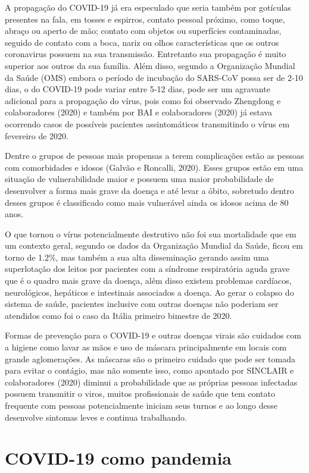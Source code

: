 A propagação do COVID-19 já era especulado que seria também por gotículas presentes na fala, em tosses e espirros, contato pessoal próximo, como toque, abraço ou aperto de mão; contato com objetos ou superfícies contaminadas, seguido de contato com a boca, nariz ou olhos características que os outros coronavirus possuem na sua transmissão. Entretanto sua propagação é muito superior aos outros da sua família. Além disso, segundo a Organização Mundial da Saúde (OMS) embora o período de incubação do SARS-CoV possa ser de 2-10 dias, o do COVID-19 pode variar entre 5-12 dias, pode ser um agravante adicional para a propagação do vírus, pois como foi observado Zhengdong e colaboradores (2020) e também por BAI e colaboradores (2020) já estava ocorrendo casos de possíveis pacientes assintomáticos transmitindo o vírus em fevereiro de 2020.

Dentre o grupos de pessoas mais propensas a terem complicações estão as pessoas com comorbidades e idosos (Galvão e Roncalli, 2020). Esses grupos estão em uma situação de vulnerabilidade maior e possuem uma maior probabilidade de desenvolver a forma mais grave da doença e até levar a óbito, sobretudo dentro desses grupos é classificado como mais vulnerável ainda os idosos acima de 80 anos.

O que tornou o vírus potencialmente destrutivo não foi sua mortalidade que em um contexto geral, segundo os dados da Organização Mundial da Saúde, ficou em torno de 1.2\%, mas também a sua alta disseminação gerando assim uma superlotação dos leitos por pacientes com a síndrome respiratória aguda grave que é o quadro mais grave da doença, além disso existem problemas cardíacos, neurológicos, hepáticos e intestinais associados a doença. Ao gerar o colapso do sistema de saúde, pacientes inclusive com outras doenças não poderiam ser atendidos como foi o caso da Itália primeiro bimestre de 2020.

Formas de prevenção para o COVID-19 e outras doenças virais são cuidados com a higiene como lavar as mãos e uso de máscara principalmente em locais com grande aglomerações. As máscaras são o primeiro cuidado que pode ser tomada para evitar o contágio, mas não somente isso, como apontado por SINCLAIR e colaboradores (2020) diminui a probabilidade que as próprias pessoas infectadas possuem transmitir o viros, muitos profissionais de saúde que tem contato frequente com pessoas potencialmente iniciam seus turnos e ao longo desse desenvolve sintomas leves e continua trabalhando.    

\section{COVID-19 como pandemia}


